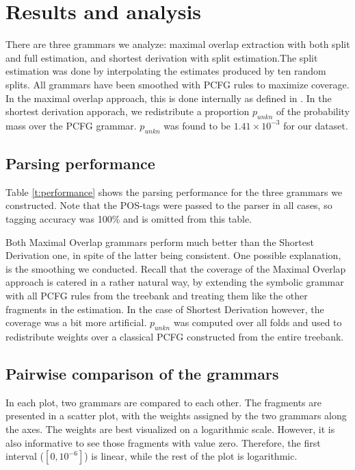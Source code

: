 \section{Results and analysis}\label{sec:Results}

There are three grammars we analyze: maximal overlap extraction with both split and full estimation, and shortest derivation with split estimation.The split estimation was done by interpolating the estimates produced by ten random splits.  All grammars have been smoothed with PCFG rules to maximize coverage. In the maximal overlap approach, this is done internally as defined in \ddop{}. In the shortest derivation apporach, we redistribute a proportion $p_{unkn}$ of the probability mass over the PCFG grammar. $p_{unkn}$ was found to be $1.41\times 10^{-3}$ for our dataset.%

\subsection{Parsing performance}

\begin{table}

\label{t:performance}
\end{table}

Table \ref{t:performance} shows the parsing performance for the three grammars we constructed. Note that the POS-tags were passed to the parser in all cases, so tagging accuracy was 100\% and is omitted from this table. %

Both Maximal Overlap grammars perform much better than the Shortest Derivation one, in spite of the latter being consistent. 
One possible explanation, is the smoothing we conducted. Recall that the coverage of the Maximal Overlap approach is catered in a rather natural way, by extending the symbolic grammar with all PCFG rules from the treebank and treating them like the other fragments in the estimation. In the case of Shortest Derivation however, the coverage was a bit more artificial. $p_{unkn}$ was computed over all folds and used to redistribute weights over a classical PCFG constructed from the entire treebank. 


\subsection{Pairwise comparison of the grammars}
In each plot, two grammars are compared to each other. The fragments are presented in a scatter plot, with the weights assigned by the two grammars along the axes. The weights are best visualized on a logarithmic scale. However, it is also informative to see those fragments with value zero. Therefore, the first interval ($[0,10^{-6}]$) is linear, while the rest of the plot is logarithmic. %

